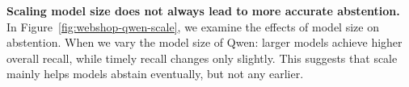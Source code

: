 \documentclass{llmxive}
\begin{document}
\vspace{-1mm}
\textbf{Scaling model size does not always lead to more accurate abstention.} In Figure~\ref{fig:webshop-qwen-scale}, we examine the effects of model size on abstention. When we vary the model size of Qwen: larger models achieve higher overall recall, while timely recall changes only slightly. This suggests that scale mainly helps models abstain eventually, but not any earlier. 





















\end{document}
